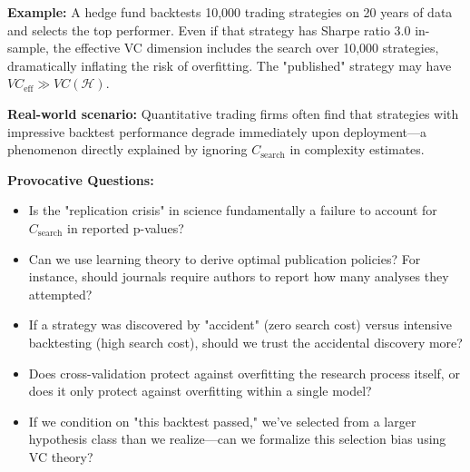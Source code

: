   \textbf{Example:} A hedge fund backtests 10,000 trading strategies on
  20 years of data and selects the top performer. Even if that strategy has
  Sharpe ratio 3.0 in-sample, the effective VC dimension includes the
  search over 10,000 strategies, dramatically inflating the risk of overfitting.
  The "published" strategy may have $VC_{\text{eff}}\gg VC(\mathcal{H})$.

  \textbf{Real-world scenario:} Quantitative trading firms often find that
  strategies with impressive backtest performance degrade immediately upon
  deployment—a phenomenon directly explained by ignoring $C_{\text{search}}$
  in complexity estimates.

  \textbf{Provocative Questions:}
  \begin{itemize}
    \item Is the "replication crisis" in science fundamentally a failure
      to account for $C_{\text{search}}$ in reported p-values?

    \item Can we use learning theory to derive optimal publication policies?
      For instance, should journals require authors to report how many analyses
      they attempted?

    \item If a strategy was discovered by "accident" (zero search cost) versus
      intensive backtesting (high search cost), should we trust the
      accidental discovery more?

    \item Does cross-validation protect against overfitting the research
      process itself, or does it only protect against overfitting within
      a single model?

    \item If we condition on "this backtest passed," we've selected from
      a larger hypothesis class than we realize—can we formalize this
      selection bias using VC theory?
  \end{itemize}

